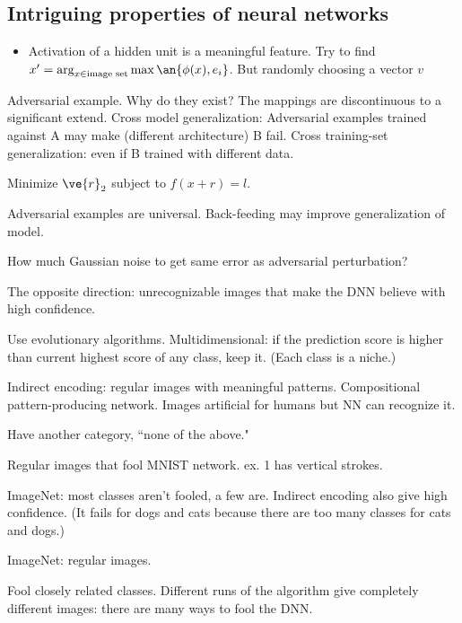 \subsection{Intriguing properties of neural networks}

\begin{itemize}
\item
Activation of a hidden unit is a meaningful feature. Try to find $x'=\arg_{x\in \text{image set}}\max\an{\phi(x),e_i}$. But randomly choosing a vector $v$ 
\end{itemize}

Adversarial example. Why do they exist? The mappings are discontinuous to a significant extend. Cross model generalization: Adversarial examples trained against A may make (different architecture) B fail. Cross training-set generalization: even if B trained with different data.

Minimize $\ve{r}_2$ subject to $f(x+r)=l$.

Adversarial examples are universal. Back-feeding may improve generalization of model. 

How much Gaussian noise to get same error as adversarial perturbation?

The opposite direction: unrecognizable images that make the DNN believe with high confidence.

Use evolutionary algorithms. Multidimensional: if the prediction score is higher than current highest score of any class, keep it. (Each class is a niche.)

Indirect encoding: regular images with meaningful patterns. Compositional pattern-producing network. Images artificial for humans but NN can recognize it.

Have another category, ``none of the above."

Regular images that fool MNIST network. ex. 1 has vertical strokes.

ImageNet: most classes aren't fooled, a few are. Indirect encoding also give high confidence. (It fails for dogs and cats because there are too many classes for cats and dogs.)

ImageNet: regular images.

Fool closely related classes. Different runs of the algorithm give completely different images: there are many ways to fool the DNN. 

